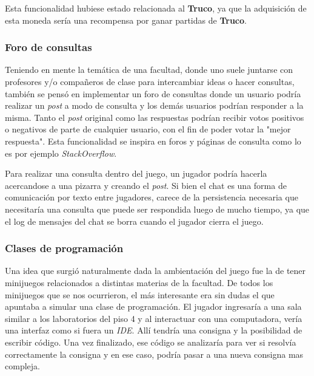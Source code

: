 Esta funcionalidad hubiese estado relacionada al \textbf{Truco}, ya que la adquisición de esta moneda
sería una recompensa por ganar partidas de \textbf{Truco}.

\subsubsection{Foro de consultas}

\noindent Teniendo en mente la temática de una facultad, donde uno suele juntarse con profesores y/o compañeros de clase
para intercambiar ideas o hacer consultas, también se pensó en implementar un foro de consultas donde un usuario
podría realizar un \textit{post} a modo de consulta y los demás usuarios podrían responder a la misma. Tanto el \textit{post}
original como las respuestas podrían recibir votos positivos o negativos de parte de cualquier usuario, con el fin
de poder votar la "mejor respuesta". Esta funcionalidad se inspira en foros y páginas de consulta como lo es por ejemplo
\textit{StackOverflow}.

Para realizar una consulta dentro del juego, un jugador podría hacerla acercandose a una pizarra y creando el \textit{post}.
Si bien el chat es una forma de comunicación por texto entre jugadores, carece de la persistencia necesaria que necesitaría
una consulta que puede ser respondida luego de mucho tiempo, ya que el log de mensajes del chat se borra cuando el jugador
cierra el juego.

\subsubsection{Clases de programación}

\noindent Una idea que surgió naturalmente dada la ambientación del juego fue la de tener minijuegos relacionados a distintas materias
de la facultad. De todos los minijuegos que se nos ocurrieron, el más interesante era sin dudas el que apuntaba a simular
una clase de programación. El jugador ingresaría a una sala similar a los laboratorios del piso 4 y al interactuar con una
computadora, vería una interfaz como si fuera un \textit{IDE}. Allí tendría una consigna y la posibilidad de escribir código.
Una vez finalizado, ese código se analizaría para ver si resolvía correctamente la consigna y en ese caso, podría pasar a una nueva
consigna mas compleja.

